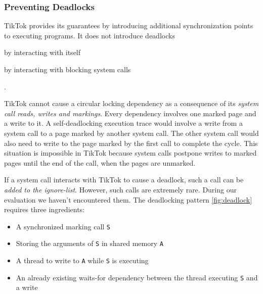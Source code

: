 \documentclass[conference]{IEEEtran}
\newcommand{\sysname}{TikTok}
\begin{document}
\subsubsection{Preventing Deadlocks}
\label{subsubsec:deadlocks}

\sysname{} provides its guarantees by introducing additional synchronization
points to executing programs. It does not introduce deadlocks
\begin{enumerate*}\item by interacting with itself \item by interacting with
blocking system calls\end{enumerate*}.

\sysname{} cannot cause a circular locking dependency as a consequence of its
\emph{system call reads, writes and markings}. Every dependency involves one
marked page and a write to it. A self-deadlocking execution trace would involve
a write from a system call to a page marked by another system call. The other
system call would also need to write to the page marked by the first call to
complete the cycle. This situation is impossible in \sysname{} because system
calls postpone writes to marked pages until the end of the call, when the pages
are unmarked.

If a system call interacts with \sysname{} to cause a deadlock, such a call can
be \emph{added to the ignore-list}. However, such calls are extremely rare.
During our evaluation we haven't encountered them. The deadlocking pattern
\autoref{fig:deadlock} requires three ingredients:

\begin{itemize}
  \item A synchronized marking call \texttt{S}
  \item Storing the arguments of \texttt{S} in shared memory \texttt{A}
  \item A thread to write to \texttt{A} while \texttt{S} is executing
  \item An already existing waits-for dependency between the thread executing
  \texttt{S} and a write
\end{itemize}
\end{document}
